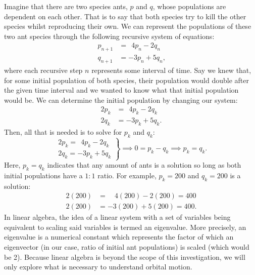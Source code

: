 Imagine that there are two species ants, $p$ and $q$, whose populations are dependent on each other.
That is to say that both species try to kill the other species whilst reproducing their own.
We can represent the populations of these two ant species through the following recursive system of equations:
\begin{align*}
	p_{n+1} &=\ \ 4p_n - 2q_n \\
	q_{n+1} &= -3p_n + 5q_n \text{,}
\end{align*}
where each recursive step $n$ represents some interval of time.
Say we knew that, for some initial population of both species, their population would double after the given time interval and we wanted to know what that initial population would be.
We can determine the initial population by changing our system:
\begin{align*}
	2p_k &=\ \ 4p_k - 2q_k \\
	2q_k &= -3p_k + 5q_k \text{.}
\end{align*}
Then, all that is needed is to solve for $p_k$ and $q_k$:
\begin{equation*}
	\left. \begin{array}{l}
		2p_k =\ \ 4p_k - 2q_k \\
		2q_k = -3p_k + 5q_k
	\end{array} \right \} \implies
	0 = p_k - q_k \implies
	p_k = q_k \text{.}
\end{equation*}
Here, $p_k = q_k$ indicates that any amount of ants is a solution so long as both initial populations have a $1 : 1$ ratio. For example, $p_k = 200$ and $q_k = 200$ is a solution:
\begin{align*}
	2(200) &=\quad \!4(200) - 2(200) = 400 \\
	2(200) &= -3(200) + 5(200) = 400 \text{.}
\end{align*}
In linear algebra, the idea of a linear system with a set of variables being equivalent to scaling said variables is termed an eigenvalue. 
More precisely, an eigenvalue is a numerical constant which represents the factor of which an eigenvector (in our case, ratio of initial ant populations) is scaled (which would be 2).
Because linear algebra is beyond the scope of this investigation, we will only explore what is necessary to understand orbital motion.

